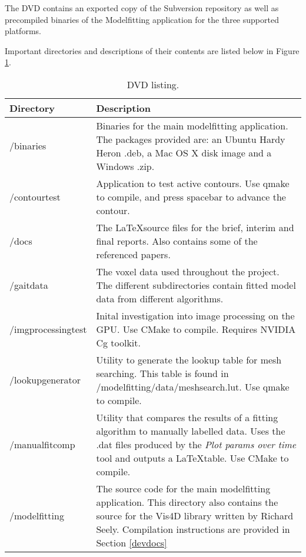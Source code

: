 The DVD contains an exported copy of the Subversion repository as well as precompiled binaries of the Modelfitting application for the three supported platforms.

Important directories and descriptions of their contents are listed below in Figure \ref{dvdlisting}.

\begin{table}[thb]
	\centering
	\begin{tabular}{|l|p{8cm}|}
		\hline
		Directory & Description \\
		\hline
		/binaries & Binaries for the main modelfitting application.
			The packages provided are: an Ubuntu Hardy Heron .deb, a Mac OS X disk image and a Windows .zip. \\
		/contourtest & Application to test active contours.
			Use qmake to compile, and press spacebar to advance the contour. \\
		/docs & The \LaTeX source files for the brief, interim and final reports.
			Also contains some of the referenced papers. \\
		/gaitdata & The voxel data used throughout the project.
			The different subdirectories contain fitted model data from different algorithms. \\
		/imgprocessingtest & Inital investigation into image processing on the GPU.
			Use CMake to compile.
			Requires NVIDIA Cg toolkit. \\
		/lookupgenerator & Utility to generate the lookup table for mesh searching.
			This table is found in /modelfitting/data/meshsearch.lut.
			Use qmake to compile. \\
		/manualfitcomp & Utility that compares the results of a fitting algorithm to manually labelled data.
			Uses the .dat files produced by the \emph{Plot params over time} tool and outputs a \LaTeX table.
			Use CMake to compile. \\
		/modelfitting & The source code for the main modelfitting application.
			This directory also contains the source for the Vis4D library written by Richard Seely.
			Compilation instructions are provided in Section \ref{devdocs} \\
		\hline
	\end{tabular}
	\caption{DVD listing.}
	\label{dvdlisting}
\end{table}

